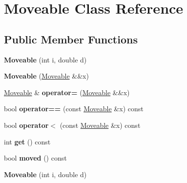 \hypertarget{class_moveable}{}\section{Moveable Class Reference}
\label{class_moveable}
\subsection*{Public Member Functions}
\begin{DoxyCompactItemize}
\item 
\mbox{\label{class_moveable_abb9e849473ef67d2e62a5c310d60dee9}} 
{\bfseries Moveable} (int i, double d)
\item 
\mbox{\label{class_moveable_a8efd14a2649c1396e6461fbae17c36b1}} 
{\bfseries Moveable} (\mbox{\hyperlink{class_moveable}{Moveable}} \&\&x)
\item 
\mbox{\label{class_moveable_ab53585b17a1e20ec6c1a25a530634a92}} 
\mbox{\hyperlink{class_moveable}{Moveable}} \& {\bfseries operator=} (\mbox{\hyperlink{class_moveable}{Moveable}} \&\&x)
\item 
\mbox{\label{class_moveable_a913e4886aa94c7d876fab5be7dd44988}} 
bool {\bfseries operator==} (const \mbox{\hyperlink{class_moveable}{Moveable}} \&x) const
\item 
\mbox{\label{class_moveable_a7f5c349c4cef251010951bf012e67267}} 
bool {\bfseries operator$<$} (const \mbox{\hyperlink{class_moveable}{Moveable}} \&x) const
\item 
\mbox{\label{class_moveable_a99435c0b3477247e039d148d4ade71ec}} 
int {\bfseries get} () const
\item 
\mbox{\label{class_moveable_a304d31368cde7d7d111477eef8453487}} 
bool {\bfseries moved} () const
\item 
\mbox{\label{class_moveable_abb9e849473ef67d2e62a5c310d60dee9}} 
{\bfseries Moveable} (int i, double d)
\item 
\mbox{\label{class_moveable_a8efd14a2649c1396e6461fbae17c36b1}} 

\end{DoxyCompactItemize}
